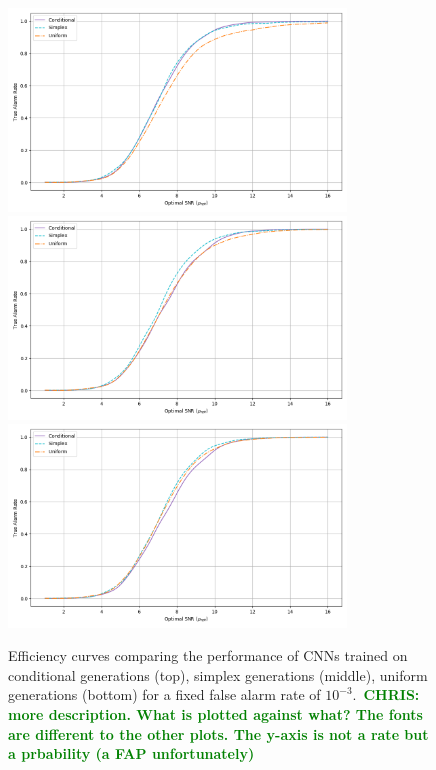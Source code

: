 \documentclass[12pt]{iopart}
\newcommand{\chris}[1]{\textbf{\textcolor{green}{CHRIS: #1}}}
\begin{document}
\begin{figure}
    \centering
    \includegraphics[width=0.8\textwidth]{figures/conditional_trained.png}
    \includegraphics[width=0.8\textwidth]{figures/simplex_trained.png}
    \includegraphics[width=0.8\textwidth]{figures/uniform_trained.png}
    \caption{Efficiency curves comparing the performance of \acp{CNN} trained on
conditional generations (top), simplex generations (middle), uniform
generations (bottom) for a fixed false alarm rate of $10^{-3}$.~\chris{more
description. What is plotted against what? The fonts are different to the other
plots. The y-axis is not a rate but a prbability (a FAP unfortunately)}}
\label{fig:roc_curves} 
\end{figure}
\end{document}
